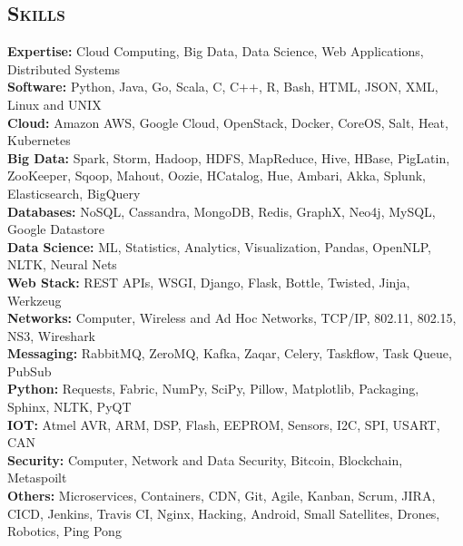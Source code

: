 \begin{resume}


\section{\textsc{Skills}}
{\bf Expertise:} Cloud Computing, Big Data, Data Science, Web Applications, Distributed Systems
\\ {\bf Software:} Python, Java, Go, Scala, C, C++, R, Bash, HTML, JSON, XML, Linux and UNIX
\\ {\bf Cloud:} Amazon AWS, Google Cloud, OpenStack, Docker, CoreOS, Salt, Heat, Kubernetes
\\ {\bf Big Data:} Spark, Storm, Hadoop, HDFS, MapReduce, Hive, HBase, PigLatin, ZooKeeper, Sqoop, Mahout, Oozie, HCatalog, Hue, Ambari, Akka, Splunk, Elasticsearch, BigQuery
\\ {\bf Databases:} NoSQL, Cassandra, MongoDB, Redis, GraphX, Neo4j, MySQL, Google Datastore
\\ {\bf Data Science:} ML, Statistics, Analytics, Visualization, Pandas, OpenNLP, NLTK, Neural Nets
\\ {\bf Web Stack:} REST APIs, WSGI, Django, Flask, Bottle, Twisted, Jinja, Werkzeug
\\ {\bf Networks:} Computer, Wireless and Ad Hoc Networks, TCP/IP, 802.11, 802.15, NS3, Wireshark
\\ {\bf Messaging:} RabbitMQ, ZeroMQ, Kafka, Zaqar, Celery, Taskflow, Task Queue, PubSub
\\ {\bf Python:} Requests, Fabric, NumPy, SciPy, Pillow, Matplotlib, Packaging, Sphinx, NLTK, PyQT
\\ {\bf IOT:} Atmel AVR, ARM, DSP, Flash, EEPROM, Sensors, I2C, SPI, USART, CAN
\\ {\bf Security:} Computer, Network and Data Security, Bitcoin, Blockchain, Metaspoilt
\\ {\bf Others:} Microservices, Containers, CDN, Git, Agile, Kanban, Scrum, JIRA, CICD, Jenkins, Travis CI, Nginx, Hacking, Android, Small Satellites, Drones, Robotics, Ping Pong


\end{resume}
